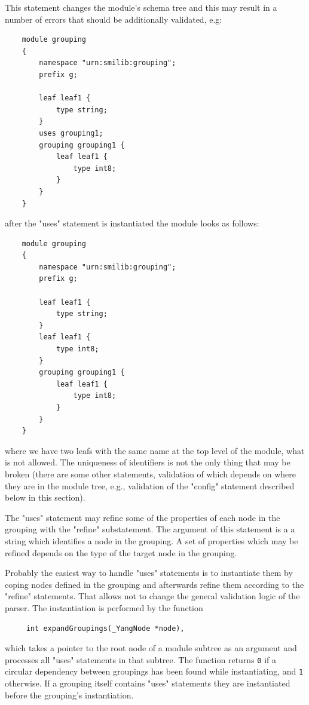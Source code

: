 \documentclass[conference]{IEEEtran}
\begin{document}
This statement changes the module's schema tree and this may result in a number of errors that should be additionally validated, e.g:   
\small
\begin{verbatim}
    module grouping 
    {
        namespace "urn:smilib:grouping";
        prefix g;

        leaf leaf1 {
            type string;
        }
        uses grouping1; 
        grouping grouping1 {
            leaf leaf1 {
                type int8;
            }
        }
    }
\end{verbatim}
\normalsize
after the "uses" statement is instantiated the module looks as follows:
\small
\begin{verbatim}
    module grouping 
    {
        namespace "urn:smilib:grouping";
        prefix g;

        leaf leaf1 {
            type string;
        }
        leaf leaf1 {
            type int8;
        }
        grouping grouping1 {
            leaf leaf1 {
                type int8;
            }
        }		
    }
\end{verbatim}
\normalsize
where we have two leafs with the same name at the top level of the module, what is not allowed. The uniqueness of identifiers is not the only thing that may be 
broken (there are some other statements, validation of which depends on where they are in the module tree, e.g., validation of the "config" statement described below in this section).

The "uses" statement may refine some of the properties of each node in the grouping with the "refine" substatement.  The argument of this statement is a a string which
identifies a node in the grouping. A set of properties which may be refined depends on the type of the target node in the grouping.

Probably the easiest way to handle "uses" statements is to instantiate them by coping nodes defined in the grouping and afterwards refine them according to
the "refine" statements. That allows not to change the general validation logic of the parser. The instantiation is performed by the function
\small
\begin{verbatim}
     int expandGroupings(_YangNode *node),
\end{verbatim}
\normalsize
which takes a pointer to the root node of a module subtree as an argument and processes all "uses" statements in that subtree. 
The function returns \texttt{0} if a circular dependency between groupings has been found while instantiating, and \texttt{1} otherwise.  
If a grouping itself contains "uses" statements they are instantiated before the grouping's instantiation.  
\end{document}
